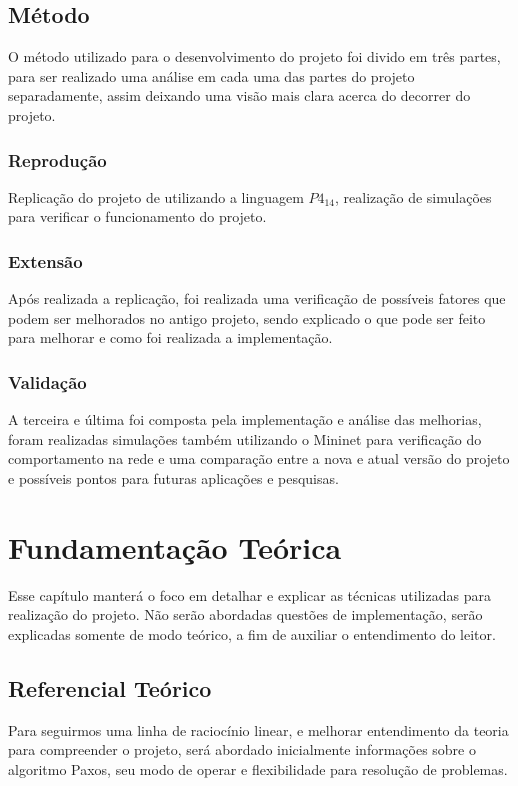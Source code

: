 \documentclass[
    12pt,
    openright, 
    oneside,
    a4paper,
    french,
    english,
    brazil
    ]{facom-ufu-abntex2}
\theoremstyle{definition}
\begin{document}
\section{Método}
O método utilizado para o desenvolvimento do projeto foi divido em três partes, para
ser realizado uma análise em cada uma das partes do projeto separadamente, assim deixando uma
visão mais clara acerca do decorrer do projeto.

\subsection{Reprodução}
Replicação do projeto de \cite{dang2016paxos} utilizando a linguagem 
$P4_{14}$, realização de simulações para verificar o funcionamento do projeto.

\subsection{Extensão}
Após realizada a replicação, foi realizada uma verificação de possíveis fatores que podem ser 
melhorados no antigo projeto, sendo explicado o que pode ser feito para melhorar e como foi
realizada a implementação.

\subsection{Validação}
A terceira e última foi composta pela implementação e análise das melhorias, foram realizadas
simulações também utilizando o Mininet para verificação do comportamento na rede e uma comparação
entre a nova e atual versão do projeto e possíveis pontos para futuras aplicações e pesquisas.



\chapter{Fundamentação Teórica}
Esse capítulo manterá o foco em detalhar e explicar as técnicas utilizadas para realização 
do projeto. Não serão abordadas questões de implementação, serão explicadas somente de modo
teórico, a fim de auxiliar o entendimento do leitor.

\section{Referencial Teórico}
Para seguirmos uma linha de raciocínio linear, e melhorar entendimento da teoria
para compreender o projeto, será abordado inicialmente informações sobre o 
algoritmo Paxos, seu modo de operar e flexibilidade para resolução de problemas.
\end{document}
